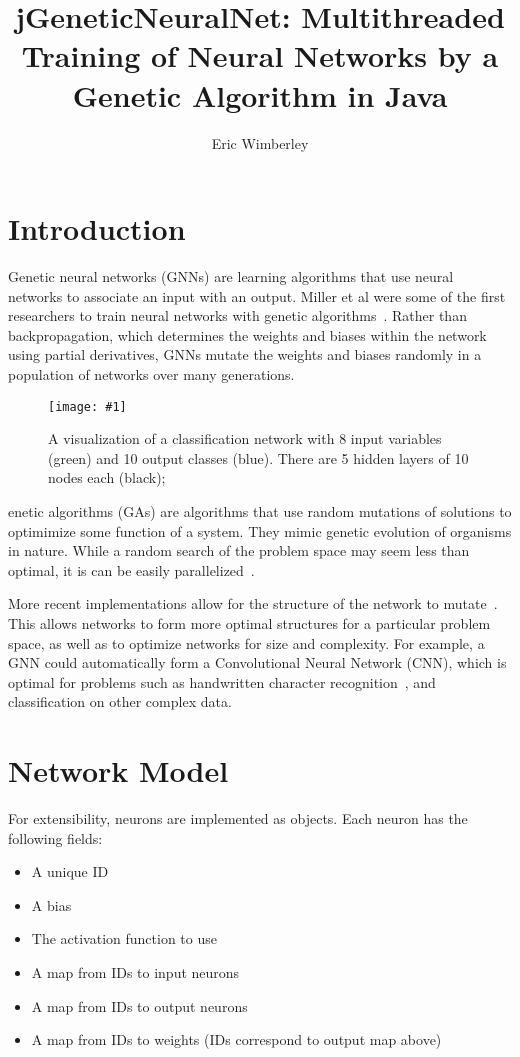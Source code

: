 \documentclass[twocolumn]{article}
\title{jGeneticNeuralNet: Multithreaded Training of Neural Networks by a Genetic Algorithm in Java}
\author{Eric Wimberley}
\newcommand\fig[5]{
	\begin{figure}[H]
		\begin{center}\texttt{[image: \#1]}\end{center}
		\caption{#4}\label{fig:#2}
	\end{figure}
}
\begin{document}
\maketitle

\begin{abstract}
\lipsum[1]
\end{abstract}

\section{Introduction}
Genetic neural networks (GNNs) are learning algorithms that use neural networks to associate an input with an output. Miller et al were some of the first researchers to train neural networks with genetic algorithms~\cite{MillerToddHedge}. Rather than backpropagation, which determines the weights and biases within the network using partial derivatives, GNNs mutate the weights and biases randomly in a population of networks over many generations. 

\fig{images/visualization.png}{networkVis}{0.18}{
A visualization of a classification network with 8 input variables (green) and 10 output classes (blue). There are 5 hidden layers of 10 nodes each (black);
}

Genetic algorithms (GAs) are algorithms that use random mutations of solutions to optimimize some function of a system. They mimic genetic evolution of organisms in nature. While a random search of the problem space may seem less than optimal, it is can be easily parallelized~\cite{Tanese:1989:DGA:915973}.

More recent implementations allow for the structure of the network to mutate~\cite{LamStructure}. This allows networks to form more optimal structures for a particular problem space, as well as to optimize networks for size and complexity. For example, a GNN could automatically form a Convolutional Neural Network (CNN), which is optimal for problems such as handwritten character recognition~\cite{ConvolutionalCharacterClassification}, and classification on other complex data. 

\section{Network Model}
For extensibility, neurons are implemented as objects. Each neuron has the following fields:

\begin{itemize}
	\item A unique ID 
	\item A bias
	\item The activation function to use
	\item A map from IDs to input neurons
	\item A map from IDs to output neurons
 	\item A map from IDs to weights (IDs correspond to output map above)
\end{itemize}
\end{document}
